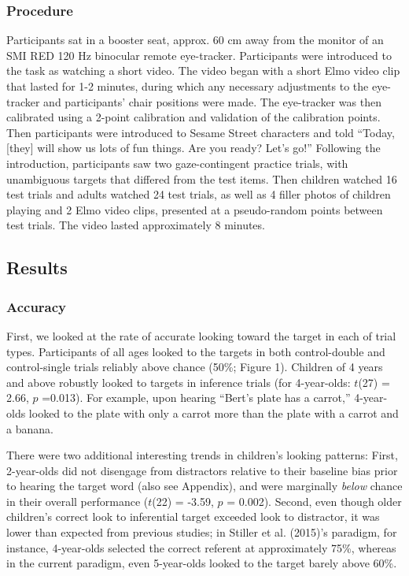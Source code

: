 \documentclass[a4paper,man,apacite,floatsintext]{apa6}
\begin{document}
\subsubsection{Procedure}\label{procedure}

Participants sat in a booster seat, approx. 60 cm away from the monitor
of an SMI RED 120 Hz binocular remote eye-tracker. Participants were
introduced to the task as watching a short video. The video began with a
short Elmo video clip that lasted for 1-2 minutes, during which any
necessary adjustments to the eye-tracker and participants' chair
positions were made. The eye-tracker was then calibrated using a 2-point
calibration and validation of the calibration points. Then participants
were introduced to Sesame Street characters and told ``Today, {[}they{]}
will show us lots of fun things. Are you ready? Let's go!'' Following
the introduction, participants saw two gaze-contingent practice trials,
with unambiguous targets that differed from the test items. Then
children watched 16 test trials and adults watched 24 test trials, as
well as 4 filler photos of children playing and 2 Elmo video clips,
presented at a pseudo-random points between test trials. The video
lasted approximately 8 minutes.

\subsection{Results}\label{results}

\subsubsection{Accuracy}\label{accuracy}

First, we looked at the rate of accurate looking toward the target in
each of trial types. Participants of all ages looked to the targets in
both control-double and control-single trials reliably above chance
(50\%; Figure 1). Children of 4 years and above robustly looked to
targets in inference trials (for 4-year-olds: \(t\)(27) = 2.66, \(p\)
=0.013). For example, upon hearing ``Bert's plate has a carrot,''
4-year-olds looked to the plate with only a carrot more than the plate
with a carrot and a banana.

There were two additional interesting trends in children's looking
patterns: First, 2-year-olds did not disengage from distractors relative
to their baseline bias prior to hearing the target word (also see
Appendix), and were marginally \emph{below} chance in their overall
performance (\(t\)(22) = -3.59, \(p\) = 0.002). Second, even though
older children's correct look to inferential target exceeded look to
distractor, it was lower than expected from previous studies; in Stiller
et al. (2015)'s paradigm, for instance, 4-year-olds selected the correct
referent at approximately 75\%, whereas in the current paradigm, even
5-year-olds looked to the target barely above 60\%.
\end{document}
